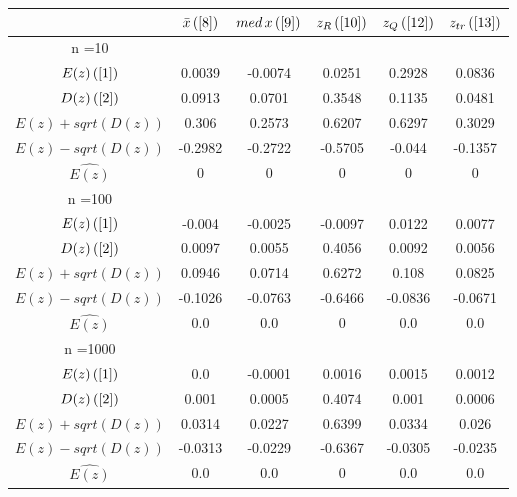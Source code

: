 \begin{tabular}{|c|c|c|c|c|c|}
\hline
 & $\bar{x} \, (\ref{8})$ & $med \, x \, (\ref{9})$ & $z_R \, (\ref{10})$ & $z_Q \, (\ref{12})$ & $z_{tr} \, (\ref{13})$ \\
\hline
n =10 &  &  &  &  & \\
\hline
$E(z) \, (\ref{1})$ & 0.0039 & -0.0074 & 0.0251 & 0.2928 & 0.0836\\
\hline
$D(z) \, (\ref{2})$ & 0.0913 & 0.0701 & 0.3548 & 0.1135 & 0.0481\\
\hline
$E(z)+sqrt(D(z))$ & 0.306 & 0.2573 & 0.6207 & 0.6297 & 0.3029\\
\hline
$E(z)-sqrt(D(z))$ & -0.2982 & -0.2722 & -0.5705 & -0.044 & -0.1357\\
\hline
$\hat{E(z)}$ & 0 & 0 & 0 & 0 & 0\\
\hline
n =100 &  &  &  &  & \\
\hline
$E(z) \, (\ref{1})$ & -0.004 & -0.0025 & -0.0097 & 0.0122 & 0.0077\\
\hline
$D(z) \, (\ref{2})$ & 0.0097 & 0.0055 & 0.4056 & 0.0092 & 0.0056\\
\hline
$E(z)+sqrt(D(z))$ & 0.0946 & 0.0714 & 0.6272 & 0.108 & 0.0825\\
\hline
$E(z)-sqrt(D(z))$ & -0.1026 & -0.0763 & -0.6466 & -0.0836 & -0.0671\\
\hline
$\hat{E(z)}$ & 0.0 & 0.0 & 0 & 0.0 & 0.0\\
\hline
n =1000 &  &  &  &  & \\
\hline
$E(z) \, (\ref{1})$ & 0.0 & -0.0001 & 0.0016 & 0.0015 & 0.0012\\
\hline
$D(z) \, (\ref{2})$ & 0.001 & 0.0005 & 0.4074 & 0.001 & 0.0006\\
\hline
$E(z)+sqrt(D(z))$ & 0.0314 & 0.0227 & 0.6399 & 0.0334 & 0.026\\
\hline
$E(z)-sqrt(D(z))$ & -0.0313 & -0.0229 & -0.6367 & -0.0305 & -0.0235\\
\hline
$\hat{E(z)}$ & 0.0 & 0.0 & 0 & 0.0 & 0.0\\
\hline
\end{tabular}